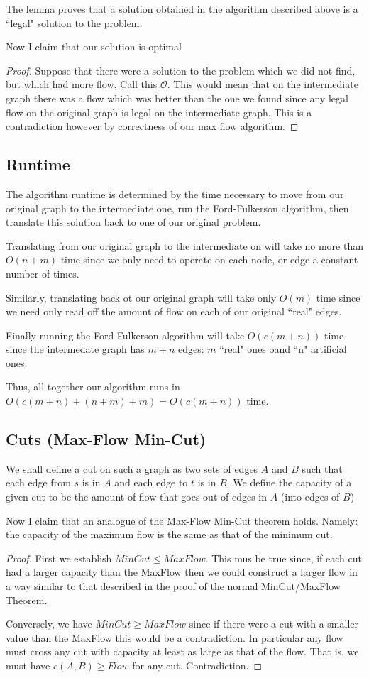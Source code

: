 \documentclass{article}
\begin{document}
The lemma proves that a solution obtained in the algorithm described above is a ``legal" solution to the problem. 

Now I claim that our solution is optimal
\begin{proof}
Suppose that there were a solution to the problem which we did not find, but which had more flow. Call this $\mathcal{O}$. This would mean that on the intermediate graph there was a flow which was better than the one we found since any legal flow on the original graph is legal on the intermediate graph. This  is a contradiction however by correctness of our max flow algorithm.
\end{proof}

\subsection{Runtime}
The algorithm runtime is determined by the time necessary to move from our original graph to the intermediate one, run the Ford-Fulkerson algorithm, then translate this solution back to one of our original problem.

Translating from our original graph to the intermediate on will take no more than $O(n+m)$ time since we only need to operate on each node, or edge a constant number of times.

Similarly, translating back ot our original graph will take only $O(m)$ time since we need only read off the amount of flow on each of our original ``real" edges. 

Finally running the Ford Fulkerson algorithm will take $O(c(m+n))$ time since the intermedate graph has $m+n$ edges: $m$ ``real" ones oand ``n" artificial ones.

Thus, all together our algorithm runs in $O(c(m+n)+(n+m)+m)=O(c(m+n))$ time.

\subsection{Cuts (Max-Flow Min-Cut)}
We shall define a cut on such a graph as two sets of edges $A$ and $B$ such that each edge from $s$ is in $A$ and each edge to $t$ is in $B$. We define the capacity of a given cut to be the amount of flow that goes out of edges in $A$ (into edges of $B$)

Now I claim that an analogue of the Max-Flow Min-Cut theorem holds. Namely: the capacity of the maximum flow is the same as that of the minimum cut.
\begin{proof}
First we establish $MinCut \leq MaxFlow$. This mus be true since, if each cut had a larger capacity than the MaxFlow then we could construct a larger flow in a way similar to that described in the proof  of the normal MinCut/MaxFlow Theorem.

Conversely, we have  $MinCut \geq MaxFlow$ since if there were a cut with a smaller value than the MaxFlow this would be a contradiction. In particular any flow must cross any cut with capacity at least as large as that of the flow. That is, we must have $c(A,B) \geq Flow$ for any cut. Contradiction.
\end{proof}
\end{document}
